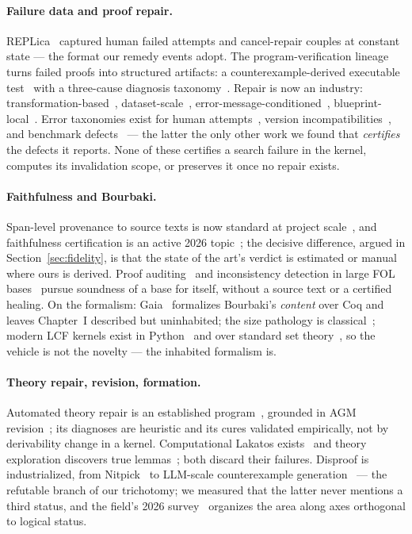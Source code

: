 \documentclass[11pt]{article}
\theoremstyle{remark}\newtheorem{example}{Example}
\begin{document}
\paragraph{Failure data and proof repair.}
REPLica~\cite{ringer2020replica} captured human failed attempts and cancel-repair
couples at constant state --- the format our remedy events adopt. The
program-verification lineage turns failed proofs into structured artifacts: a
counterexample-derived executable test~\cite{huang2023proof2test} with a three-cause
diagnosis taxonomy~\cite{petiot2016fails}. Repair is now an industry:
transformation-based~\cite{ringer2018pumpkin}, dataset-scale~\cite{reichel2023proofrepair},
error-message-conditioned~\cite{first2023baldur,april2026}, blueprint-local~\cite{blueprintrepair2026}.
Error taxonomies exist for human attempts~\cite{aitken2000errors}, version
incompatibilities~\cite{hou2025versions}, and benchmark defects~\cite{faults2026} ---
the latter the only other work we found that \emph{certifies} the defects it reports.
None of these certifies a search failure in the kernel, computes its invalidation
scope, or preserves it once no repair exists.

\paragraph{Faithfulness and Bourbaki.}
Span-level provenance to source texts is now standard at project
scale~\cite{m2f2026,proofnet2023}, and faithfulness certification is an active 2026
topic~\cite{faithfulnessgap2026,formalrx2026}; the decisive difference, argued in
Section~\ref{sec:fidelity}, is that the state of the art's verdict is estimated or
manual where ours is derived. Proof auditing~\cite{adams2016auditing} and
inconsistency detection in large FOL bases~\cite{schulz2017inconsistencies} pursue
soundness of a base for itself, without a source text or a certified healing. On the
formalism: Gaia~\cite{grimm2010gaia} formalizes Bourbaki's \emph{content} over Coq
and leaves Chapter~I described but uninhabited; the size pathology is
classical~\cite{mathias2002term}; modern LCF kernels exist in
Python~\cite{knuckledragger} and over standard set theory~\cite{guilloud2023lisa}, so
the vehicle is not the novelty --- the inhabited formalism is.

\paragraph{Theory repair, revision, formation.}
Automated theory repair is an established
program~\cite{li2022abc,li2022entrenchment,troquard2018weakening}, grounded in AGM
revision~\cite{agm1985}; its diagnoses are heuristic and its cures validated
empirically, not by derivability change in a kernel. Computational Lakatos
exists~\cite{pease2007lakatos} and theory exploration discovers true
lemmas~\cite{johansson2014hipster}; both discard their failures. Disproof is
industrialized, from Nitpick~\cite{blanchette2011nitpick} to LLM-scale counterexample
generation~\cite{learningtodisprove2026} --- the refutable branch of our trichotomy;
we measured that the latter never mentions a third status, and the field's 2026
survey~\cite{conjecturingsurvey2026} organizes the area along axes orthogonal to
logical status.
\end{document}
